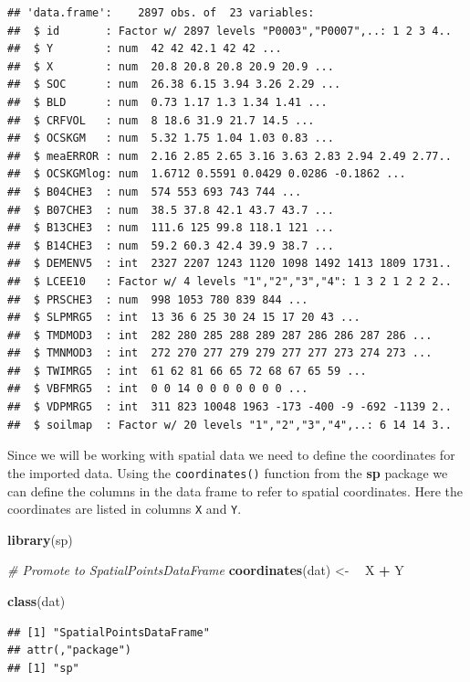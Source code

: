 \documentclass[10pt,b5paper,]{book}
\newenvironment{Shaded}{\begin{snugshade}}{\end{snugshade}}
\newcommand{\CommentTok}[1]{\textcolor[rgb]{0.56,0.35,0.01}{\textit{#1}}}
\newcommand{\ErrorTok}[1]{\textcolor[rgb]{0.64,0.00,0.00}{\textbf{#1}}}
\newcommand{\KeywordTok}[1]{\textcolor[rgb]{0.13,0.29,0.53}{\textbf{#1}}}
\newcommand{\NormalTok}[1]{#1}
\newcommand{\OperatorTok}[1]{\textcolor[rgb]{0.81,0.36,0.00}{\textbf{#1}}}
\newcommand{\StringTok}[1]{\textcolor[rgb]{0.31,0.60,0.02}{#1}}
\theoremstyle{definition}
\theoremstyle{definition}
\theoremstyle{definition}
\theoremstyle{remark}
\begin{document}
\begin{verbatim}
## 'data.frame':    2897 obs. of  23 variables:
##  $ id       : Factor w/ 2897 levels "P0003","P0007",..: 1 2 3 4..
##  $ Y        : num  42 42 42.1 42 42 ...
##  $ X        : num  20.8 20.8 20.8 20.9 20.9 ...
##  $ SOC      : num  26.38 6.15 3.94 3.26 2.29 ...
##  $ BLD      : num  0.73 1.17 1.3 1.34 1.41 ...
##  $ CRFVOL   : num  8 18.6 31.9 21.7 14.5 ...
##  $ OCSKGM   : num  5.32 1.75 1.04 1.03 0.83 ...
##  $ meaERROR : num  2.16 2.85 2.65 3.16 3.63 2.83 2.94 2.49 2.77..
##  $ OCSKGMlog: num  1.6712 0.5591 0.0429 0.0286 -0.1862 ...
##  $ B04CHE3  : num  574 553 693 743 744 ...
##  $ B07CHE3  : num  38.5 37.8 42.1 43.7 43.7 ...
##  $ B13CHE3  : num  111.6 125 99.8 118.1 121 ...
##  $ B14CHE3  : num  59.2 60.3 42.4 39.9 38.7 ...
##  $ DEMENV5  : int  2327 2207 1243 1120 1098 1492 1413 1809 1731..
##  $ LCEE10   : Factor w/ 4 levels "1","2","3","4": 1 3 2 1 2 2 2..
##  $ PRSCHE3  : num  998 1053 780 839 844 ...
##  $ SLPMRG5  : int  13 36 6 25 30 24 15 17 20 43 ...
##  $ TMDMOD3  : int  282 280 285 288 289 287 286 286 287 286 ...
##  $ TMNMOD3  : int  272 270 277 279 279 277 277 273 274 273 ...
##  $ TWIMRG5  : int  61 62 81 66 65 72 68 67 65 59 ...
##  $ VBFMRG5  : int  0 0 14 0 0 0 0 0 0 0 ...
##  $ VDPMRG5  : int  311 823 10048 1963 -173 -400 -9 -692 -1139 2..
##  $ soilmap  : Factor w/ 20 levels "1","2","3","4",..: 6 14 14 3..
\end{verbatim}

Since we will be working with spatial data we need to define the
coordinates for the imported data. Using the \texttt{coordinates()}
function from the \textbf{sp}  package we can
define the columns in the data frame to refer to spatial coordinates.
Here the coordinates are listed in columns \texttt{X} and \texttt{Y}.

\begin{Shaded}
\begin{Highlighting}[]
\KeywordTok{library}\NormalTok{(sp)}

\CommentTok{# Promote to SpatialPointsDataFrame}
\KeywordTok{coordinates}\NormalTok{(dat) <-}\StringTok{ }\ErrorTok{~}\StringTok{ }\NormalTok{X }\OperatorTok{+}\StringTok{ }\NormalTok{Y}

\KeywordTok{class}\NormalTok{(dat)}
\end{Highlighting}
\end{Shaded}

\begin{verbatim}
## [1] "SpatialPointsDataFrame"
## attr(,"package")
## [1] "sp"
\end{verbatim}
\end{document}
